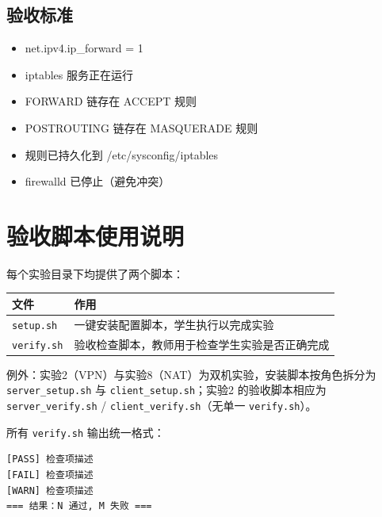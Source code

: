 \documentclass[12pt,a4paper]{ctexart}
\begin{document}
\subsection{验收标准}

\begin{itemize}
  \item net.ipv4.ip\_forward = 1
  \item iptables 服务正在运行
  \item FORWARD 链存在 ACCEPT 规则
  \item POSTROUTING 链存在 MASQUERADE 规则
  \item 规则已持久化到 /etc/sysconfig/iptables
  \item firewalld 已停止（避免冲突）
\end{itemize}

\newpage
\section{验收脚本使用说明}

每个实验目录下均提供了两个脚本：

\begin{table}[h]
\centering
\begin{tabular}{lp{10cm}}
\toprule
文件 & 作用 \\
\midrule
\texttt{setup.sh}  & 一键安装配置脚本，学生执行以完成实验 \\
\texttt{verify.sh} & 验收检查脚本，教师用于检查学生实验是否正确完成 \\
\bottomrule
\end{tabular}
\end{table}

\begin{warnbox}
  例外：实验2（VPN）与实验8（NAT）为双机实验，安装脚本按角色拆分为
  \texttt{server\_setup.sh} 与 \texttt{client\_setup.sh}；实验2 的验收脚本相应为
  \texttt{server\_verify.sh} / \texttt{client\_verify.sh}（无单一 \texttt{verify.sh}）。
\end{warnbox}

所有 \texttt{verify.sh} 输出统一格式：

\begin{cmdbox}
\begin{lstlisting}[language=bash,numbers=none]
[PASS] 检查项描述
[FAIL] 检查项描述
[WARN] 检查项描述
=== 结果：N 通过, M 失败 ===
\end{lstlisting}
\end{cmdbox}
\end{document}
